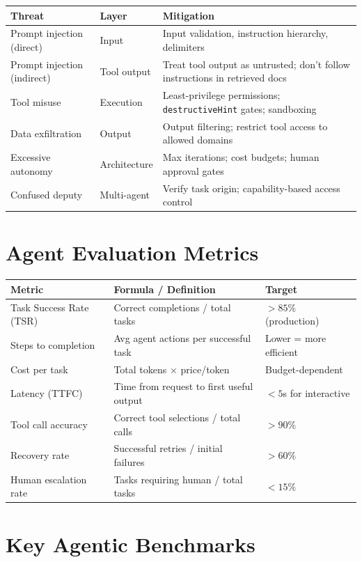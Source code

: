 \begin{tabular}{@{}lp{5cm}p{8cm}@{}}
\toprule
\textbf{Threat} & \textbf{Layer} & \textbf{Mitigation} \\
\midrule
Prompt injection (direct) & Input & Input validation, instruction hierarchy, delimiters \\
Prompt injection (indirect) & Tool output & Treat tool output as untrusted; don’t follow instructions in retrieved docs \\
Tool misuse & Execution & Least-privilege permissions; \texttt{destructiveHint} gates; sandboxing \\
Data exfiltration & Output & Output filtering; restrict tool access to allowed domains \\
Excessive autonomy & Architecture & Max iterations; cost budgets; human approval gates \\
Confused deputy & Multi-agent & Verify task origin; capability-based access control \\
\bottomrule
\end{tabular}

\section{Agent Evaluation Metrics}
\label{agent-evaluation-metrics}

\begin{tabular}{@{}lp{5cm}p{8cm}@{}}
\toprule
\textbf{Metric} & \textbf{Formula / Definition} & \textbf{Target} \\
\midrule
Task Success Rate (TSR) & Correct completions / total tasks & $>85\%$ (production) \\
Steps to completion & Avg agent actions per successful task & Lower = more efficient \\
Cost per task & Total tokens $\times$ price/token & Budget-dependent \\
Latency (TTFC) & Time from request to first useful output & $<5$s for interactive \\
Tool call accuracy & Correct tool selections / total calls & $>90\%$ \\
Recovery rate & Successful retries / initial failures & $>60\%$ \\
Human escalation rate & Tasks requiring human / total tasks & $<15\%$ \\
\bottomrule
\end{tabular}

\section{Key Agentic Benchmarks}
\label{key-agentic-benchmarks}

